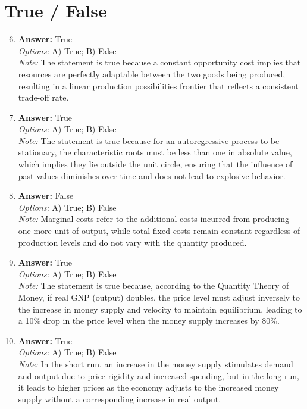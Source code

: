 \documentclass[12pt]{article}
\begin{document}
\section*{True / False}
\begin{enumerate}[label=\arabic*.]
\setcounter{enumi}{5}
\item \textbf{Answer:} True
\\ \textit{Options:} A) True; B) False
\\ \textit{Note:} The statement is true because a constant opportunity cost implies that resources are perfectly adaptable between the two goods being produced, resulting in a linear production possibilities frontier that reflects a consistent trade-off rate.
\item \textbf{Answer:} True
\\ \textit{Options:} A) True; B) False
\\ \textit{Note:} The statement is true because for an autoregressive process to be stationary, the characteristic roots must be less than one in absolute value, which implies they lie outside the unit circle, ensuring that the influence of past values diminishes over time and does not lead to explosive behavior.
\item \textbf{Answer:} False
\\ \textit{Options:} A) True; B) False
\\ \textit{Note:} Marginal costs refer to the additional costs incurred from producing one more unit of output, while total fixed costs remain constant regardless of production levels and do not vary with the quantity produced.
\item \textbf{Answer:} True
\\ \textit{Options:} A) True; B) False
\\ \textit{Note:} The statement is true because, according to the Quantity Theory of Money, if real GNP (output) doubles, the price level must adjust inversely to the increase in money supply and velocity to maintain equilibrium, leading to a 10\% drop in the price level when the money supply increases by 80\%.
\item \textbf{Answer:} True
\\ \textit{Options:} A) True; B) False
\\ \textit{Note:} In the short run, an increase in the money supply stimulates demand and output due to price rigidity and increased spending, but in the long run, it leads to higher prices as the economy adjusts to the increased money supply without a corresponding increase in real output.
\end{enumerate}
\end{document}
